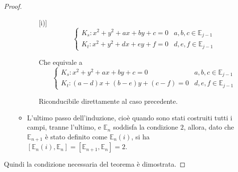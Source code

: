 \begin{proof}
\begin{enumerate}
\begin{itemize}
\begin{enumerate} [i)]
\begin{displaymath}
 \left\{ \begin{array}{ll}
 K_{s}: x^2 + y^2 + ax + by + c = 0         &     a,b,c \in \mathbb{E}_{j-1} \\
 K_{t}: x^2 + y^2 +dx + ey + f = 0           &     d,e,f \in \mathbb{E}_{j-1}
 \end{array} \right.
 \end{displaymath}

Che equivale a 
\begin{displaymath}
 \left\{ \begin{array}{ll}
 K_{s}: x^2 + y^2 + ax + by + c = 0         &     a,b,c \in \mathbb{E}_{j-1} \\
 K_{t}: (a-d)x + (b-e)y + (c-f) = 0           &     d,e,f \in \mathbb{E}_{j-1}
 \end{array} \right.
 \end{displaymath}
 
 Riconducibile direttamente al caso precedente.
\end{enumerate}

\item L'ultimo passo dell'induzione, cioè quando sono stati costruiti tutti i campi, tranne l'ultimo, e $\mathbb{E}_{n}$ soddisfa la condizione $2$, allora, dato che $\mathbb{E}_{n+1}$ è stato definito come $\mathbb{E}_{n}(i)$, si ha $[\mathbb{E}_{n}(i), \mathbb{E}_{n}] =[\mathbb{E}_{n+1}, \mathbb{E}_{n}] =  2$.

\end{itemize}

\end{enumerate}
Quindi la condizione necessaria del teorema è dimostrata.
\end{proof}

